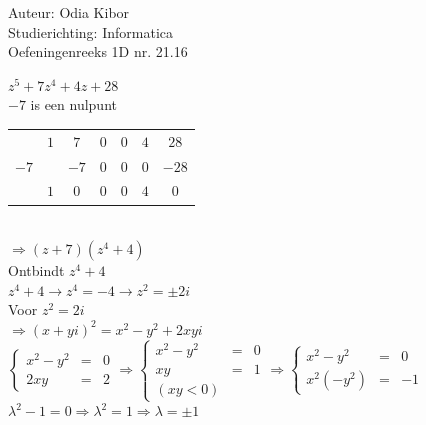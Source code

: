 \documentclass[a4paper]{article}
\begin{document}
  
\noindent \large Auteur: Odia Kibor \\
\noindent \large Studierichting: Informatica\\
\noindent \large Oefeningenreeks 1D nr. 21.16\\

\medskip

\normalsize

$z^5 + 7z^4 + 4z + 28$\\

$-7$ is een nulpunt\\

\begin{tabular}{c|cccccc}
		& $1$ & $7$  & $0$ & $0$ & $4$ & $28$\\
$-7$ 	&     & $-7$ & $0$ & $0$ & $0$ & $-28$\\ \hline
		& $1$ & $0$  & $0$ & $0$ & $4$ & $0$\\
\end{tabular}\\

$\Rightarrow (z + 7)(z^4 + 4)$\\

Ontbindt $z^4 + 4$\\

$z^4 + 4 \rightarrow z^4 = -4 \rightarrow z^2 = \pm 2i$\\

Voor $z^2 = 2i$\\

$\Rightarrow (x + yi)^2 = x^2 - y^2 + 2xyi$\\

$\left\{
	\begin{array}{lll}
		x^2 - y^2 & = & 0\\
		2xy & = &  2
	\end{array}
\right .
\Rightarrow
\left\{
	\begin{array}{lll}
		x^2 - y^2 & = & 0\\
		xy & = & 1\\
        (xy < 0)
	\end{array}
\right .
\Rightarrow
\left\{
	\begin{array}{lll}
		x^2 - y^2 & = & 0\\
		x^2 (-y^2) & = & -1
	\end{array}
\right .$\\

$\lambda^2 -1 = 0 \Rightarrow \lambda^2 = 1 \Rightarrow \lambda = \pm 1$\\
\end{document}
